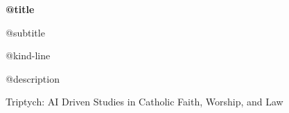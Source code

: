 \vspace*{0.12\textheight}
{\Huge\bfseries @{title}\par}
\vspace{0.9em}
{\Large @{subtitle}\par}
\vspace{1.6em}
{\large @{kind-line}\par}
\vspace{0.9em}
{\normalsize @{description}\par}
\vfill
{\small Triptych: AI Driven Studies in Catholic Faith, Worship, and Law\par}

